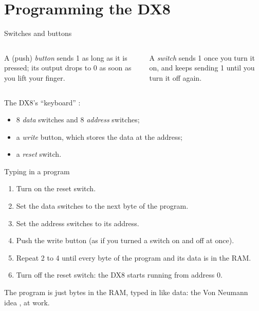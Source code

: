 \documentclass[10pt]{wosm-slides}
\begin{document}
\section{Programming the DX8}

\begin{frame}{Switches and buttons}
  \begin{columns}[T, totalwidth=\textwidth]
      \begin{definition}[Button]
        A (push) \emph{button} sends 1 as long as it is pressed; its output drops to
        0 as soon as you lift your finger.
      \end{definition}
      \begin{definition}[Switch]
        A \emph{switch} sends 1 once you turn it on, and keeps sending 1 until you
        turn it off again.
      \end{definition}
  \end{columns}

  \medskip
  The DX8's ``keyboard'' :
  \begin{itemize}
    \item 8 \emph{data} switches and 8 \emph{address} switches;
    \item a \emph{write} button, which stores the data at the address;
    \item a \emph{reset} switch.
  \end{itemize}
\end{frame}

\begin{frame}{Typing in a program}
  \begin{enumerate}
    \item Turn \alert{on} the reset switch.
    \item Set the data switches to the next byte of the program.
    \item Set the address switches to its address.
    \item Push the write button (as if you turned a switch on and off at once).
    \item Repeat 2 to 4 until every byte of the program and its data is in the RAM.
    \item Turn \alert{off} the reset switch: the DX8 starts running from address 0.
  \end{enumerate}

  \begin{remark}
    The program is just bytes in the RAM, typed in like data: the Von Neumann idea
    , at work.
  \end{remark}
\end{frame}
\end{document}
